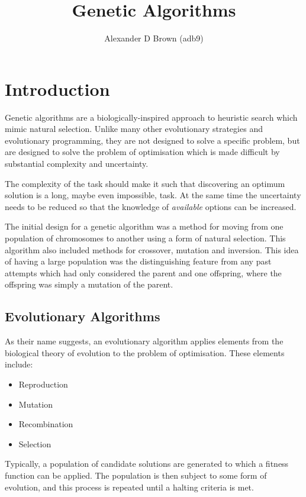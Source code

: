 \documentclass[10pt, a4paper]{article}
\title{Genetic Algorithms}
\author{Alexander D Brown (adb9)}
\begin{document}
\maketitle
\tableofcontents

\newpage
\section{Introduction}
Genetic algorithms are a biologically-inspired approach to heuristic search 
which mimic natural selection. Unlike many other evolutionary strategies and
evolutionary programming, they are not designed to solve a specific problem,
but are designed to solve the problem of optimisation which is made difficult
by substantial complexity and uncertainty\cite{Holland1992Adaptation}.

The complexity of the task should make it such that discovering an optimum
solution is a long, maybe even impossible, task. At the same time the 
uncertainty needs to be reduced so that the knowledge of \textit{available}
options can be increased.

The initial design for a genetic algorithm was a method for moving from one
population of chromosomes to another using a form of natural selection. This
algorithm also included methods for crossover, mutation and inversion. This
idea of having a large population was the distinguishing feature from any past
attempts which had only considered the parent and one offspring, where the 
offspring was simply a mutation of the parent\cite{Mitchell1996Introduction}.


\subsection{Evolutionary Algorithms}
As their name suggests, an evolutionary algorithm applies elements from the 
biological theory of evolution to the problem of optimisation. These elements
include:

\begin{itemize}
\item Reproduction
\item Mutation
\item Recombination
\item Selection
\end{itemize}

Typically, a population of candidate solutions are generated to which a fitness
function can be applied. The population is then subject to some form of 
evolution, and this process is repeated until a halting criteria is met.
\end{document}
